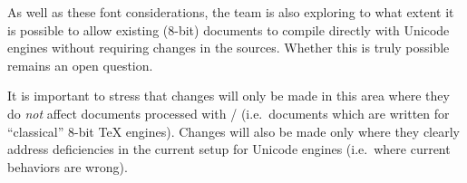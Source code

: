 \documentclass{ltnews}
\begin{document}
As well as these font considerations, the team is also exploring
to what extent it is possible to allow existing ($8$-bit)
documents to compile directly with Unicode engines without requiring
changes in the sources. Whether this is truly possible remains an open
question.

It is important to stress that changes will only be made in this area where
they do \emph{not} affect documents processed with
/ (i.e.~documents which are written for
``classical'' $8$-bit \TeX{} engines). Changes will also be made only where
they clearly address deficiencies in the current setup for Unicode engines
(i.e.~where current behaviors are wrong).
\end{document}
